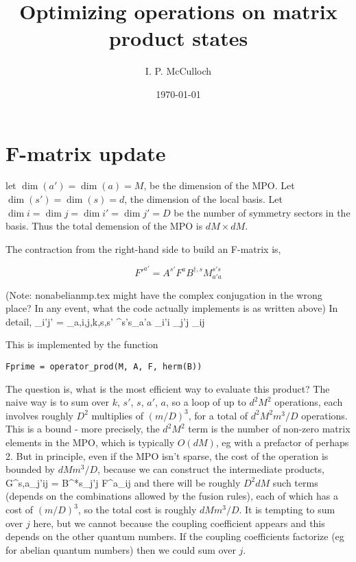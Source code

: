 \documentclass{article}[10pt]
\begin{document}
\title{Optimizing operations on matrix product states}

\author{I. P. McCulloch}
\date{\today}

\maketitle

\section{F-matrix update}

let $\dim(a') = \dim(a) = M$, be the dimension of the MPO. Let $\dim(s') = \dim(s) = d$, the dimension
of the local basis. Let $\dim{i} = \dim{j} = \dim{i'} = \dim{j'} = D$ be the number of symmetry sectors
in the basis. Thus the total demension of the MPO is $dM \times dM$.

The contraction from the right-hand side to build an F-matrix is,

\begin{equation}
F'^{a'} = A^{s'} F^a B^{\dagger,s} M^{s's}_{a'a}
\end{equation}

(Note: nonabelianmp.tex might have the complex conjugation in the wrong place? In any event,
what the code actually implements is as written above) In detail, 
\beq
{}_{i'j'} =
\sum_{a,i,j,k,s,s'}
^{s's}_{a'a} _{i'i} _{j'j} 
_{ij}
\eeq

This is implemented by the function 
\begin{verbatim}Fprime = operator_prod(M, A, F, herm(B))\end{verbatim}

The question is, what is the most efficient way to evaluate this product? The naive way is to sum over
$k$, $s'$, $s$, $a'$, $a$, so a loop of up to $d^2 M^2$ operations, each involves roughly $D^2$ multiplies
of $(m/D)^3$, for a total of $d^2 M^2 m^3 / D$ operations. This is a bound - more precisely, the
$d^2 M^2$ term is the number of non-zero matrix elements in the MPO, which is typically $O(dM)$, eg with 
a prefactor of perhaps 2. But in principle, even if the MPO isn't sparse, the cost of the operation is bounded
by $d M m^3 / D$, because we can construct the intermediate products,
\beq
G^{s,a}_{j'ij} = B^{*s}_{j'j} F^a_{ij}
\eeq
and there will be roughly $D^2 dM$ such terms (depends on the combinations allowed by the fusion rules), 
each of which has a cost of
$(m/D)^3$, so the total cost is roughly $dM m^3/D$.
It is tempting to sum over $j$ here, but we cannot because the coupling coefficient appears and
this depends on the other quantum numbers. If the coupling coefficients factorize (eg for abelian quantum numbers)
then we could sum over $j$.
\end{document}
